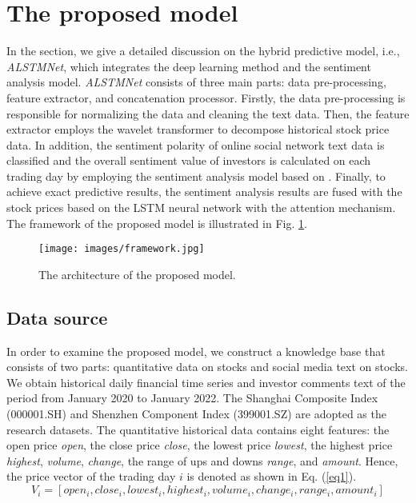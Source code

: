 \documentclass[sn-mathphys]{sn-jnl}%
\theoremstyle{thmstyleone}%
\theoremstyle{thmstyletwo}%
\theoremstyle{thmstylethree}%
\begin{document}
\section{The proposed model}\label{3The proposed model}
In the section, we give a detailed discussion on the hybrid predictive model, i.e., {\it ALSTMNet}, which integrates the deep learning method and the sentiment analysis model. {\it ALSTMNet} consists of three main parts: data pre-processing, feature extractor, and concatenation processor. Firstly, the data pre-processing is responsible for normalizing the data and cleaning the text data. Then, the feature extractor employs the wavelet transformer to decompose historical stock price data. In addition, the sentiment polarity of online social network text data is classified and the overall sentiment value of investors is calculated on each trading day by employing the sentiment analysis model based on \cite{RN167}. Finally, to achieve exact predictive results, the sentiment analysis results are fused with the stock prices based on the LSTM neural network with the attention mechanism. The framework of the proposed model is illustrated in Fig. \ref{fig1}.

\renewcommand{\figurename}{Fig.}
\begin{figure}[h]%
	\centering
	\texttt{[image: images/framework.jpg]}
	\caption{The architecture of the proposed model.} \label{fig1}
\end{figure}

\subsection{Data source}\label{Data source}
In order to examine the proposed model, we construct a knowledge base that consists of two parts: quantitative data on stocks and social media text on stocks. We obtain historical daily financial time series and investor comments text of the period from January 2020 to January 2022. The Shanghai Composite Index (000001.SH) and Shenzhen Component Index (399001.SZ) are adopted as the research datasets. The quantitative historical data contains eight features: the open price {\it open}, the close price {\it close}, the lowest price {\it lowest}, the highest price {\it highest}, {\it volume}, {\it change}, the range of ups and downs {\it range}, and {\it amount}. Hence, the price vector of the trading day $i$ is denoted as shown in Eq. (\ref{eq1}).
\begin{equation}
V_i = \left[open_i, close_i, lowest_i, highest_i, volume_i, change_i, range_i, amount_i\right]     \label{eq1}
\end{equation}
\end{document}
